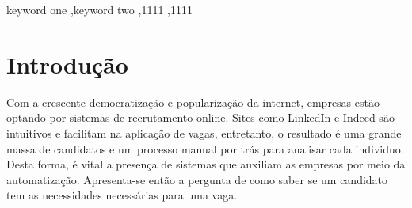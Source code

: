 \documentclass[preprint,12pt]{elsarticle}
\begin{document}
\begin{frontmatter}
\begin{abstract}
\end{abstract}



\begin{keyword}
keyword one \sep keyword two
 \sep 1111
 \sep 1111
\end{keyword}

\end{frontmatter}


\section{Introdução}
\label{sec:introducao}


Com a crescente democratização e popularização da internet, empresas estão optando por sistemas de recrutamento online. Sites como LinkedIn e Indeed são intuitivos e facilitam na aplicação de vagas, entretanto, o resultado é uma grande massa de candidatos e um processo manual por trás para analisar cada individuo. Desta forma, é vital a presença de sistemas que auxiliam as empresas por meio da automatização. Apresenta-se então a pergunta de como saber se um candidato tem as necessidades necessárias para uma vaga.


\end{document}
